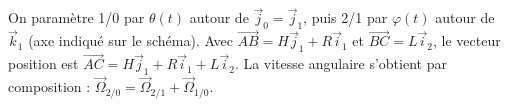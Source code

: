 \begin{corrigebox}
On paramètre 1/0 par $\theta(t)$ autour de $\vec j_0=\vec j_1$, puis 2/1 par
$\varphi(t)$ autour de $\vec k_1$ (axe indiqué sur le schéma). Avec
$\overrightarrow{AB}=H\vec j_1+R\vec i_1$ et
$\overrightarrow{BC}=L\vec i_2$, le vecteur position est
$\overrightarrow{AC}=H\vec j_1+R\vec i_1+L\vec i_2$.
La vitesse angulaire s'obtient par composition :
$\vec\Omega_{2/0}=\vec\Omega_{2/1}+\vec\Omega_{1/0}$.
\end{corrigebox}
